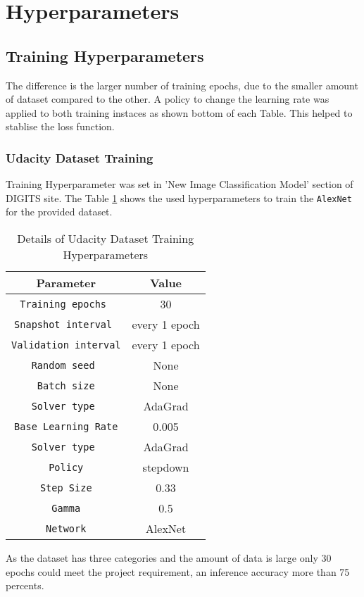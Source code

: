 \documentclass[10pt,journal,compsoc]{IEEEtran}
\begin{document}
\section{Hyperparameters}
\subsection{Training Hyperparameters}
The difference is the larger number of training epochs, due to the smaller amount of dataset compared to the other.
A policy to change the learning rate was applied to both training instaces as shown bottom of each Table. This helped to stablise the loss function.

\subsubsection{Udacity Dataset Training}

Training Hyperparameter was set in 'New Image Classification Model' section of DIGITS site. The Table \ref{table:Udacity Dataset Training Hyperparameters} shows the used hyperparameters to train the \verb!AlexNet! for the provided dataset.
\begin{table}[ht]
      \caption{Details of Udacity Dataset Training Hyperparameters }
      \label{table:Udacity Dataset Training Hyperparameters}
      \begin{center}
      \begin{tabular}{|c|c|}
      \hline
      Parameter & Value \\
      \hline\hline
      \verb!Training epochs ! & 30\\
      \hline
      \verb!Snapshot interval ! & every 1 epoch\\
      \hline
      \verb!Validation interval! & every 1 epoch\\
      \hline
      \verb!Random seed ! & None\\
      \hline
      \verb!Batch size! & None\\
      \hline
      \verb!Solver type ! & AdaGrad\\
      \hline
      \verb!Base Learning Rate! & 0.005\\
      \hline
      \verb!Solver type ! & AdaGrad\\
      \hline
      \verb!Policy! & stepdown\\
      \hline
      \verb!Step Size! & 0.33\\
      \hline
      \verb!Gamma! & 0.5\\
      \hline
      \verb!Network! & AlexNet\\
      \hline
      \end{tabular}
      \end{center}
\end{table}
As the dataset has three categories and the amount of data is large only 30 epochs could meet the project requirement, an inference accuracy more than 75 percents.
\end{document}

